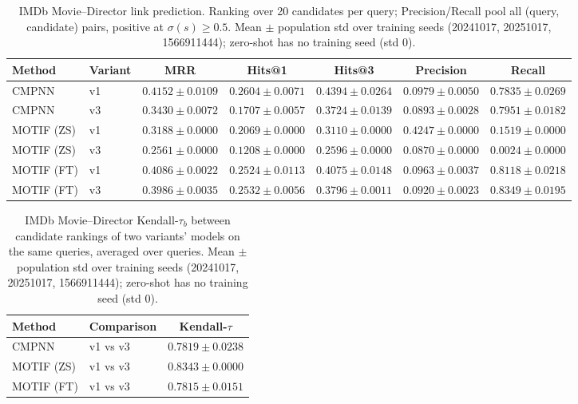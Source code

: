 \documentclass{article}
\begin{document}
\begin{table}[t]
\centering
\small
\begin{tabular}{||l||l||c|c|c||c|c||}
\hline
\textbf{Method} & \textbf{Variant} & \textbf{MRR} & \textbf{Hits@1} & \textbf{Hits@3} & \textbf{Precision} & \textbf{Recall} \\
\hline\hline
CMPNN & v1 & $0.4152 \pm 0.0109$ & $0.2604 \pm 0.0071$ & $0.4394 \pm 0.0264$ & $0.0979 \pm 0.0050$ & $0.7835 \pm 0.0269$ \\
\hline
CMPNN & v3 & $0.3430 \pm 0.0072$ & $0.1707 \pm 0.0057$ & $0.3724 \pm 0.0139$ & $0.0893 \pm 0.0028$ & $0.7951 \pm 0.0182$ \\
\hline
\hline
MOTIF (ZS) & v1 & $0.3188 \pm 0.0000$ & $0.2069 \pm 0.0000$ & $0.3110 \pm 0.0000$ & $0.4247 \pm 0.0000$ & $0.1519 \pm 0.0000$ \\
\hline
MOTIF (ZS) & v3 & $0.2561 \pm 0.0000$ & $0.1208 \pm 0.0000$ & $0.2596 \pm 0.0000$ & $0.0870 \pm 0.0000$ & $0.0024 \pm 0.0000$ \\
\hline
\hline
MOTIF (FT) & v1 & $0.4086 \pm 0.0022$ & $0.2524 \pm 0.0113$ & $0.4075 \pm 0.0148$ & $0.0963 \pm 0.0037$ & $0.8118 \pm 0.0218$ \\
\hline
MOTIF (FT) & v3 & $0.3986 \pm 0.0035$ & $0.2532 \pm 0.0056$ & $0.3796 \pm 0.0011$ & $0.0920 \pm 0.0023$ & $0.8349 \pm 0.0195$ \\
\hline
\end{tabular}
\caption{IMDb Movie--Director link prediction. Ranking over 20 candidates per query; Precision/Recall pool all (query, candidate) pairs, positive at $\sigma(s) \geq 0.5$. Mean $\pm$ population std over training seeds (20241017, 20251017, 1566911444); zero-shot has no training seed (std 0). }
\label{tab:imdb_movie_director_seed_performance}
\end{table}

\begin{table}[t]
\centering
\small
\begin{tabular}{||l||l||c||}
\hline
\textbf{Method} & \textbf{Comparison} & \textbf{Kendall-$\tau$} \\
\hline\hline
CMPNN & v1 vs v3 & $0.7819 \pm 0.0238$ \\
\hline
\hline
MOTIF (ZS) & v1 vs v3 & $0.8343 \pm 0.0000$ \\
\hline
\hline
MOTIF (FT) & v1 vs v3 & $0.7815 \pm 0.0151$ \\
\hline
\end{tabular}
\caption{IMDb Movie--Director Kendall-$\tau_b$ between candidate rankings of two variants' models on the same queries, averaged over queries. Mean $\pm$ population std over training seeds (20241017, 20251017, 1566911444); zero-shot has no training seed (std 0). }
\label{tab:imdb_movie_director_seed_invariance}
\end{table}
\end{document}
